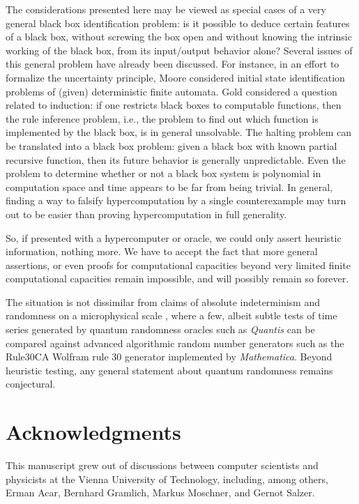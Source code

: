 \documentclass[12pt]{article}
\begin{document}
The considerations presented here may be viewed as special cases of a very general black box identification problem:
is it possible to deduce certain features of a black box, without screwing the box open and without knowing the intrinsic
working of the black box, from its input/output behavior alone?
Several issues of this general problem have already been discussed.
For instance, in an effort to formalize the uncertainty principle,
Moore \cite{e-f-moore} considered initial state identification problems of (given) deterministic finite automata.
Gold  \cite{go-67,blum75blum,angluin:83,ad-91,li:92} considered a question related to induction:
if one restricts black boxes to computable functions, then the rule inference problem,
i.e., the problem to find out which function
is implemented by the black box, is in general unsolvable.
The halting problem \cite{turing-36,rogers1,odi:89}
can be translated into a black box problem: given a black box
with known partial recursive  function,
then its future behavior is generally unpredictable.
Even the problem to determine whether or not a black box system is polynomial in computation space and
time appears to be far from being trivial.
In general, finding a way to falsify hypercomputation by a single counterexample
may turn out to be easier than proving hypercomputation in full generality.

So, if presented with a hypercomputer or oracle, we could only assert heuristic information, nothing more.
We have to accept the fact that more general assertions, or even proofs for computational capacities
beyond very limited finite computational capacities remain impossible, and will possibly remain so forever.


The situation is not dissimilar from claims of absolute indeterminism and randomness on a microphysical scale
\cite{svozil-qct}, where a few, albeit subtle tests of time series \cite{calude-dinneen05} generated by
quantum randomness oracles such as {\it Quantis}\textsuperscript{\texttrademark}  \cite{Quantis} can be compared against
advanced algorithmic random number generators
such as the  Rule30CA Wolfram rule 30 generator  implemented by {\it Mathematica}\textsuperscript{\textregistered}.
Beyond heuristic testing, any general statement about quantum randomness remains conjectural.



\section{Acknowledgments}
This manuscript grew out of discussions between computer scientists and physicists at the Vienna University of Technology,
including, among others, Erman Acar, Bernhard Gramlich, Markus Moschner, and Gernot Salzer.
\end{document}
